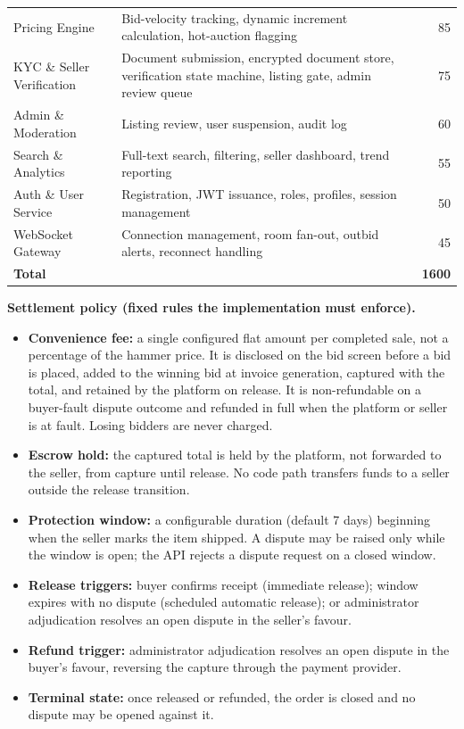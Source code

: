 \documentclass[11pt, a4paper]{article}
\begin{document}
{\begin{longtable}{@{}l p{2.9in} r@{}}
Pricing Engine            & Bid-velocity tracking, dynamic increment calculation, hot-auction flagging & 85 \\
KYC \& Seller Verification & Document submission, encrypted document store, verification state machine, listing gate, admin review queue & 75 \\
Admin \& Moderation       & Listing review, user suspension, audit log & 60 \\
Search \& Analytics       & Full-text search, filtering, seller dashboard, trend reporting & 55 \\
Auth \& User Service      & Registration, JWT issuance, roles, profiles, session management & 50 \\
WebSocket Gateway         & Connection management, room fan-out, outbid alerts, reconnect handling & 45 \\
\midrule
\textbf{Total} & & \textbf{1600} \\
\bottomrule
\end{longtable}
}

\medskip
\noindent\textbf{Settlement policy (fixed rules the implementation must enforce).}
\begin{itemize}
    \item \textbf{Convenience fee:} a single configured flat amount per completed sale, not
          a percentage of the hammer price. It is disclosed on the bid screen before a bid
          is placed, added to the winning bid at invoice generation, captured with the
          total, and retained by the platform on release. It is non-refundable on a
          buyer-fault dispute outcome and refunded in full when the platform or seller is
          at fault. Losing bidders are never charged.
    \item \textbf{Escrow hold:} the captured total is held by the platform, not forwarded
          to the seller, from capture until release. No code path transfers funds to a
          seller outside the release transition.
    \item \textbf{Protection window:} a configurable duration (default 7 days) beginning
          when the seller marks the item shipped. A dispute may be raised only while the
          window is open; the API rejects a dispute request on a closed window.
    \item \textbf{Release triggers:} buyer confirms receipt (immediate release); window
          expires with no dispute (scheduled automatic release); or administrator
          adjudication resolves an open dispute in the seller's favour.
    \item \textbf{Refund trigger:} administrator adjudication resolves an open dispute in
          the buyer's favour, reversing the capture through the payment provider.
    \item \textbf{Terminal state:} once released or refunded, the order is closed and no
          dispute may be opened against it.
\end{itemize}
\end{document}

